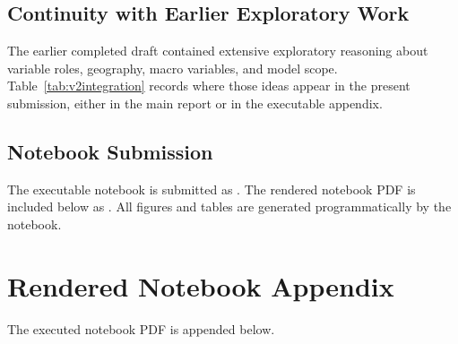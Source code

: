 \documentclass[a4paper,10pt]{article}
\begin{document}
\subsection{Continuity with Earlier Exploratory Work}

The earlier completed draft contained extensive exploratory reasoning about variable roles, geography, macro variables, and model scope. Table~\ref{tab:v2integration} records where those ideas appear in the present submission, either in the main report or in the executable appendix.

\begin{landscape}
\begin{table}[p]
\centering
\caption{Continuity between the earlier exploratory draft and the present submission.}
\label{tab:v2integration}
\scriptsize
\resizebox{\linewidth}{!}{}
\end{table}
\end{landscape}

\begin{landscape}
\begin{table}[p]
\centering
\caption{Earlier research-question coverage and its present location.}
\label{tab:v2rqcoverage}
\scriptsize
\resizebox{\linewidth}{!}{}
\end{table}
\end{landscape}

\subsection*{Notebook Submission}
The executable notebook is submitted as . The rendered notebook PDF is included below as . All figures and tables are generated programmatically by the notebook.

\clearpage
\section{Rendered Notebook Appendix}\label{sec:notebook-pdf}
The executed notebook PDF is appended below.


\end{document}

